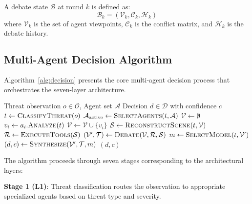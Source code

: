 \begin{definition}
\label{def:debate}
A debate state $\mathcal{B}$ at round $k$ is defined as:
\begin{equation}
\mathcal{B}_k = (\mathcal{V}_k, \mathcal{C}_k, \mathcal{H}_k)
\end{equation}
where $\mathcal{V}_k$ is the set of agent viewpoints, $\mathcal{C}_k$ is the conflict matrix, and $\mathcal{H}_k$ is the debate history.
\end{definition}

\subsection{Multi-Agent Decision Algorithm}
\label{subsec:decision-algorithm}

Algorithm~\ref{alg:decision} presents the core multi-agent decision process that orchestrates the seven-layer architecture.

\begin{algorithm}
\caption{Multi-Agent Decision Algorithm}
\label{alg:decision}
\begin{algorithmic}[1]
\Require Threat observation $o \in \mathcal{O}$, Agent set $\mathcal{A}$
\Ensure Decision $d \in \mathcal{D}$ with confidence $c$
\State $t \leftarrow \textsc{ClassifyThreat}(o)$ 
\State $\mathcal{A}_{\text{active}} \leftarrow \textsc{SelectAgents}(t, \mathcal{A})$
\State $\mathcal{V} \leftarrow \emptyset$
 
    \State $v_i \leftarrow a_i.\textsc{Analyze}(t)$
    \State $\mathcal{V} \leftarrow \mathcal{V} \cup \{v_i\}$
\EndFor
\State $\mathcal{S} \leftarrow \textsc{ReconstructScene}(t, \mathcal{V})$ 
\State $\mathcal{R} \leftarrow \textsc{ExecuteTools}(\mathcal{S})$ 
\State $(\mathcal{V}', \mathcal{T}) \leftarrow \textsc{Debate}(\mathcal{V}, \mathcal{R}, \mathcal{S})$ 
\State $m \leftarrow \textsc{SelectModel}(t, \mathcal{V}')$ 
\State $(d, c) \leftarrow \textsc{Synthesize}(\mathcal{V}', \mathcal{T}, m)$ 
\State \Return $(d, c)$
\end{algorithmic}
\end{algorithm}

The algorithm proceeds through seven stages corresponding to the architectural layers:

\textbf{Stage 1 (L1)}: Threat classification routes the observation to appropriate specialized agents based on threat type and severity.

